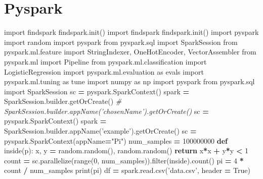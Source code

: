 \documentclass[]{book}
\newenvironment{Shaded}{\begin{snugshade}}{\end{snugshade}}
\newcommand{\KeywordTok}[1]{\textcolor[rgb]{0.13,0.29,0.53}{\textbf{#1}}}
\newcommand{\DecValTok}[1]{\textcolor[rgb]{0.00,0.00,0.81}{#1}}
\newcommand{\StringTok}[1]{\textcolor[rgb]{0.31,0.60,0.02}{#1}}
\newcommand{\ImportTok}[1]{#1}
\newcommand{\CommentTok}[1]{\textcolor[rgb]{0.56,0.35,0.01}{\textit{#1}}}
\newcommand{\VariableTok}[1]{\textcolor[rgb]{0.00,0.00,0.00}{#1}}
\newcommand{\ControlFlowTok}[1]{\textcolor[rgb]{0.13,0.29,0.53}{\textbf{#1}}}
\newcommand{\OperatorTok}[1]{\textcolor[rgb]{0.81,0.36,0.00}{\textbf{#1}}}
\newcommand{\BuiltInTok}[1]{#1}
\newcommand{\NormalTok}[1]{#1}
\begin{document}
\section{Pyspark}\label{pyspark-1}

\begin{Shaded}
\begin{Highlighting}[]
\ImportTok{import}\NormalTok{ findspark}
\NormalTok{findspark.init()}
\ImportTok{import}\NormalTok{ findspark}
\NormalTok{findspark.init()}
\ImportTok{import}\NormalTok{ pyspark}
\ImportTok{import}\NormalTok{ random}
\ImportTok{import}\NormalTok{ pyspark}
\ImportTok{from}\NormalTok{ pyspark.sql }\ImportTok{import}\NormalTok{ SparkSession}
\ImportTok{from}\NormalTok{ pyspark.ml.feature }\ImportTok{import}\NormalTok{ StringIndexer, OneHotEncoder, VectorAssembler}
\ImportTok{from}\NormalTok{ pyspark.ml }\ImportTok{import}\NormalTok{ Pipeline}
\ImportTok{from}\NormalTok{ pyspark.ml.classification }\ImportTok{import}\NormalTok{ LogisticRegression}
\ImportTok{import}\NormalTok{ pyspark.ml.evaluation }\ImportTok{as}\NormalTok{ evals}
\ImportTok{import}\NormalTok{ pyspark.ml.tuning }\ImportTok{as}\NormalTok{ tune}
\ImportTok{import}\NormalTok{ numpy }\ImportTok{as}\NormalTok{ np}
\ImportTok{import}\NormalTok{ pyspark}
\ImportTok{from}\NormalTok{ pyspark.sql }\ImportTok{import}\NormalTok{ SparkSession}
\NormalTok{sc }\OperatorTok{=}\NormalTok{ pyspark.SparkContext()}
\NormalTok{spark }\OperatorTok{=}\NormalTok{ SparkSession.builder.getOrCreate() }\CommentTok{# SparkSession.builder.appName('chosenName').getOrCreate()}
\NormalTok{sc }\OperatorTok{=}\NormalTok{ pyspark.SparkContext()}
\NormalTok{spark }\OperatorTok{=}\NormalTok{ SparkSession.builder.appName(}\StringTok{'example'}\NormalTok{).getOrCreate()}
\NormalTok{sc }\OperatorTok{=}\NormalTok{ pyspark.SparkContext(appName}\OperatorTok{=}\StringTok{"Pi"}\NormalTok{)}
\NormalTok{num_samples }\OperatorTok{=} \DecValTok{100000000}
\KeywordTok{def}\NormalTok{ inside(p):     }
\NormalTok{    x, y }\OperatorTok{=}\NormalTok{ random.random(), random.random()}
    \ControlFlowTok{return}\NormalTok{ x}\OperatorTok{*}\NormalTok{x }\OperatorTok{+}\NormalTok{ y}\OperatorTok{*}\NormalTok{y }\OperatorTok{<} \DecValTok{1}
\NormalTok{count }\OperatorTok{=}\NormalTok{ sc.parallelize(}\BuiltInTok{range}\NormalTok{(}\DecValTok{0}\NormalTok{, num_samples)).}\BuiltInTok{filter}\NormalTok{(inside).count()}
\NormalTok{pi }\OperatorTok{=} \DecValTok{4} \OperatorTok{*}\NormalTok{ count }\OperatorTok{/}\NormalTok{ num_samples}
\BuiltInTok{print}\NormalTok{(pi)}
\NormalTok{df }\OperatorTok{=}\NormalTok{ spark.read.csv(}\StringTok{'data.csv'}\NormalTok{, header }\OperatorTok{=} \VariableTok{True}\NormalTok{)}

\end{Highlighting}
\end{Shaded}
\end{document}
